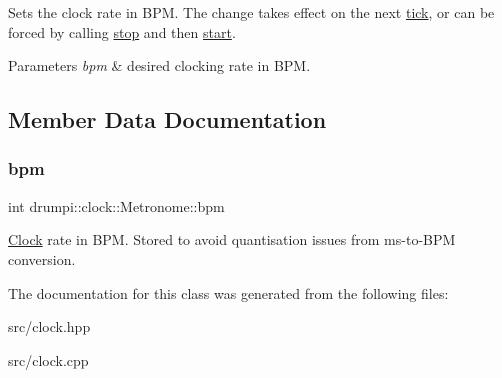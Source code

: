 Sets the clock rate in B\+PM. The change takes effect on the next \hyperlink{classdrumpi_1_1clock_1_1Clock_ade9259c06e6b90bbd92e155a2506d3a1}{tick}, or can be forced by calling \hyperlink{classdrumpi_1_1clock_1_1Clock_a0b77c3e7f33eb7ae0f018e469d96a250}{stop} and then \hyperlink{classdrumpi_1_1clock_1_1Clock_a8a050959dcff11c85d695989e9099a8c}{start}. 
\begin{DoxyParams}{Parameters}
{\em bpm} & desired clocking rate in B\+PM. \\
\hline
\end{DoxyParams}


\subsection{Member Data Documentation}
\mbox{\label{classdrumpi_1_1clock_1_1Metronome_a5319099afdc9537cc8472233e5fbb0cc}} 
\subsubsection{\texorpdfstring{bpm}{bpm}}
{\footnotesize\ttfamily int drumpi\+::clock\+::\+Metronome\+::bpm\hspace{0.3cm}{\ttfamily [private]}}

\hyperlink{classdrumpi_1_1clock_1_1Clock}{Clock} rate in B\+PM. Stored to avoid quantisation issues from ms-\/to-\/\+B\+PM conversion. 

The documentation for this class was generated from the following files\+:\begin{DoxyCompactItemize}
\item 
src/clock.\+hpp\item 
src/clock.\+cpp\end{DoxyCompactItemize}
